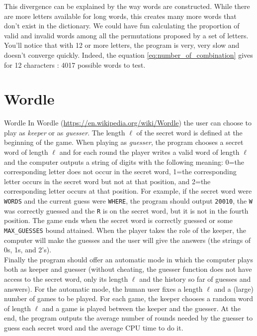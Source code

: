 \documentclass[10pt,a4paper,hidelinks]{article}
\begin{document}

This divergence can be explained by the way words are constructed. While there are more letters available for long words, this creates many more words that don't exist in the dictionary. We could have fun calculating the proportion of valid and invalid words among all the permutations proposed by a set of letters.\\

You'll notice that with 12 or more letters, the program is very, very slow and doesn't converge quickly. Indeed, the equation \ref{eq:number_of_combination} gives for 12 characters : 4017 possible words to test.

\section{Wordle}
\begin{exercise_description}{Wordle}
    In Wordle (\url{https://en.wikipedia.org/wiki/Wordle}) the user can choose to play as \textit{keeper} or as \textit{guesser}. The length $\ell$ of the secret word is defined at the beginning of the game. When playing as \textit{guesser}, the program chooses a secret word of length $\ell$ and for each round the player writes a valid word of length $\ell$ and the computer outputs a string of digits with the following meaning: 0=the corresponding letter does not occur in the secret word, 1=the corresponding letter occurs in the secret word but not at that position, and 2=the corresponding letter occurs at that position. For example, if the secret word were \verb|WORDS| and the current guess were \verb|WHERE|, the program should output \verb|20010|, the \verb|W| was correctly guessed and the \verb|R| is on the secret word, but it is not in the fourth position. The game ends when the secret word is correctly guessed or some \verb|MAX_GUESSES| bound attained. When the player takes the role of the keeper, the computer will make the guesses and the user will give the answers (the strings of 0s, 1s, and 2's).\\

    Finally the program should offer an automatic mode in which the computer plays both as keeper and guesser (without cheating, the guesser function does not have access to the secret word, only its length $\ell$ and the history so far of guesses and answers). For the automatic mode, the human user fixes a length $\ell$ and a (large) number of games to be played. For each game, the keeper chooses a random word of length $\ell$ and a game is played between the keeper and the guesser. At the end, the program outputs the average number of rounds needed by the guesser to guess each secret word and the average CPU time to do it.     
\end{exercise_description}
\end{document}
